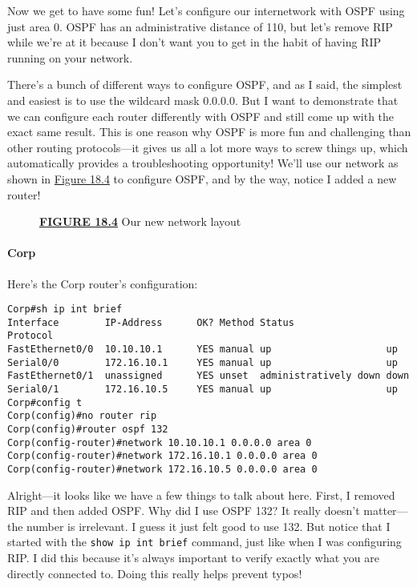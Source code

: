 Now we get to have some fun! Let's configure our internetwork with OSPF
using just area 0. OSPF has an administrative distance of 110, but let's
remove RIP while we're at it because I don't want you to get in the
habit of having RIP running on your network.

There's a bunch of different ways to configure OSPF, and as I said, the
simplest and easiest is to use the wildcard mask 0.0.0.0. But I want to
demonstrate that we can configure each router differently with OSPF and
still come up with the exact same result. This is one reason why OSPF is
more fun and challenging than other routing protocols---it gives us all
a lot more ways to screw things up, which automatically provides
\protect\hypertarget{c18.xhtmlux5cux23Page_758}{}{}a troubleshooting
opportunity! We'll use our network as shown in
\protect\hyperlink{c18.xhtmlux5cux23figure18-4}{Figure 18.4} to
configure OSPF, and by the way, notice I added a new router!

\begin{figure}
\centering
\caption{{\protect\hyperlink{c18.xhtmlux5cux23figureanchor18-4}{\textbf{FIGURE
18.4}} Our new network layout}}
\end{figure}

\paragraph{Corp}

Here's the Corp router's configuration:

\begin{verbatim}
Corp#sh ip int brief
Interface        IP-Address      OK? Method Status                Protocol
FastEthernet0/0  10.10.10.1      YES manual up                    up
Serial0/0        172.16.10.1     YES manual up                    up
FastEthernet0/1  unassigned      YES unset  administratively down down
Serial0/1        172.16.10.5     YES manual up                    up
Corp#config t
Corp(config)#no router rip
Corp(config)#router ospf 132
Corp(config-router)#network 10.10.10.1 0.0.0.0 area 0
Corp(config-router)#network 172.16.10.1 0.0.0.0 area 0
Corp(config-router)#network 172.16.10.5 0.0.0.0 area 0
\end{verbatim}

Alright---it looks like we have a few things to talk about here. First,
I removed RIP and then added OSPF. Why did I use OSPF 132? It really
doesn't matter---the number is irrelevant. I guess it just felt good to
use 132. But notice that I started with the
\texttt{show\ ip\ int\ brief} command, just like when I was configuring
RIP. I did this because it's always
\protect\hypertarget{c18.xhtmlux5cux23Page_759}{}{}important to verify
exactly what you are directly connected to. Doing this really helps
prevent typos!

